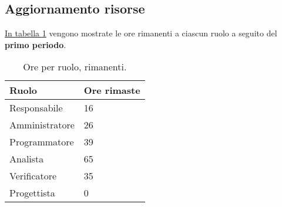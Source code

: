 \subsection{Aggiornamento risorse}

\label{sec:AggiornamentoRisorse_PrimoPeriodo}



\hyperref[tab:risorse_rimaste_primo_periodo]{In tabella \ref{tab:risorse_rimaste_primo_periodo}} vengono mostrate le ore rimanenti a ciascun ruolo a seguito del \textbf{primo periodo}.
\begin{table}[H]
    \centering
    \begin{tabular}{| l | l |}
    \hline
        \textbf{Ruolo} & 
        \textbf{Ore rimaste}\\
    \hline
        Responsabile & 16\\
    \hline
        Amministratore & 26\\
    \hline
        Programmatore & 39\\
    \hline
        Analista & 65\\
    \hline
        Verificatore & 35\\
    \hline
        Progettista & 0\\
    \hline
    \end{tabular}
    \caption{Ore per ruolo, rimanenti.}
    \label{tab:risorse_rimaste_primo_periodo} 
\end{table}